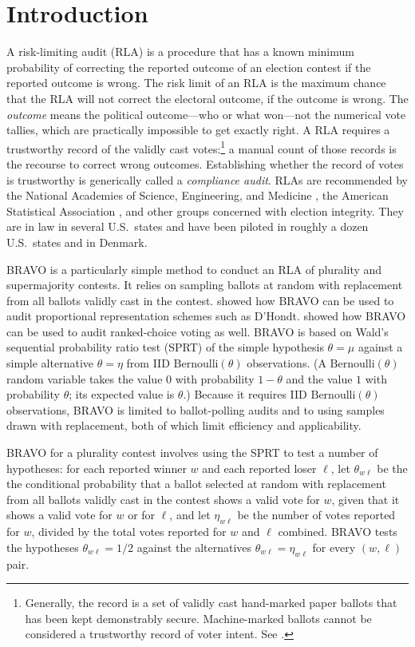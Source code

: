 \documentclass[12pt,runningheads]{llncs}
\newcommand{\Bern}{\ensuremath{\mathrm{Bernoulli}}}
\begin{document}
{\section{Introduction}
A risk-limiting audit (RLA) is a procedure that has a known minimum probability of correcting the reported outcome of an election
contest if the reported outcome is wrong.
The risk limit of an RLA is the maximum chance that the RLA will not correct the electoral outcome, if the outcome is wrong.
The \emph{outcome} means the political outcome---who or what won---not the numerical vote tallies, which are practically impossible
to get exactly right.
A RLA requires a trustworthy record of the validly cast votes:\footnote{%
Generally, the record is a set of validly cast hand-marked paper ballots that has been kept demonstrably secure.
Machine-marked ballots cannot be considered a trustworthy record of voter intent.
See \cite{appelEtal20,appelStark20,starkWagner12}.
}
 a manual count of those records is the recourse to correct
wrong outcomes.
Establishing whether the record of votes is trustworthy is generically called a \emph{compliance audit}.
RLAs are recommended by the National Academies of Science, Engineering, and Medicine \cite{nas18},
the American Statistical Association \cite{asa10}, and other groups concerned with election integrity.
They are in law in several U.S.\ states and have been piloted in roughly a dozen U.S.\ states and in Denmark.

BRAVO \cite{lindemanEtal12} is a particularly
simple method to conduct an RLA of plurality and supermajority contests.
It relies on sampling ballots at random with replacement from all ballots validly cast in the contest.
\cite{starkTeague14} showed how BRAVO can be used to audit proportional representation schemes such as D'Hondt.
\cite{blomEtal18} showed how BRAVO can be used to audit ranked-choice voting as well.
BRAVO is based on Wald's \cite{wald45} sequential probability ratio test (SPRT) of the simple hypothesis 
$\theta = \mu$ against a simple alternative $\theta = \eta$ from IID $\Bern(\theta)$ observations.
(A $\Bern(\theta)$ random variable takes the value $0$ with probability $1-\theta$ and the value $1$ with probability $\theta$;
its expected value is $\theta$.)
Because it requires IID $\Bern(\theta)$ observations, BRAVO is limited to ballot-polling audits and to using samples drawn with 
replacement, both of which limit efficiency and applicability.

BRAVO for a plurality contest involves using the SPRT to test a number of hypotheses:
for each reported winner $w$ and each reported loser $\ell$, let $\theta_{w\ell}$ be the 
the conditional probability that a ballot selected at random with replacement
from all ballots validly cast in the contest shows a valid vote for $w$, given that it shows a valid vote for $w$ or for $\ell$,
and let $\eta_{w\ell}$ be the number of votes reported for $w$, divided by the total votes reported for $w$ and $\ell$ combined.
BRAVO tests the hypotheses $\theta_{w\ell} = 1/2$ against the alternatives $\theta_{w\ell} = \eta_{w\ell}$ for every $(w, \ell)$
pair.

}
\end{document}
